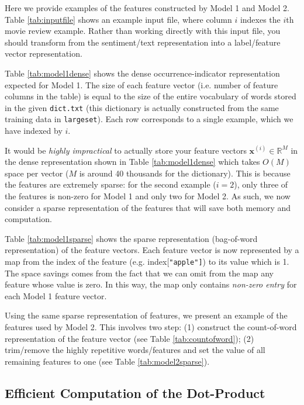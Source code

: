 \documentclass[11pt]{exam}
\numberwithin{equation}{section} %
\numberwithin{figure}{section} %
\numberwithin{table}{section} %
\newcommand{\Rb}{\mathbb{R}}
\newcommand{\xv}{\mathbf{x}}
\begin{document}
Here we provide examples of the features constructed by Model 1 and Model 2. Table \ref{tab:inputfile} shows an example input file, where column $i$  indexes the $i$th movie review example. Rather than working directly with this input file, you should transform from the sentiment/text representation into a label/feature vector representation.

Table \ref{tab:model1dense} shows the dense occurrence-indicator representation expected for Model 1. The size of each feature vector (i.e. number of feature columns in the table) is equal to the size of the entire vocabulary of words stored in the given \lstinline{dict.txt} (this dictionary is actually constructed from the same training data in \lstinline{largeset}). Each row corresponds to a single example, which we have indexed by $i$.

It would be \emph{highly impractical} to actually store your feature vectors $\xv^{(i)} \in \Rb^M$ in the dense representation shown in Table \ref{tab:model1dense} which takes $O(M)$ space per vector ($M$ is around 40 thousands for the dictionary). This is because the features are extremely sparse: for the second example ($i=2$), only three of the features is non-zero for Model 1 and only two for Model 2. As such, we now consider a sparse representation of the features that will save both memory and computation.

Table \ref{tab:model1sparse} shows the sparse representation (bag-of-word representation) of the feature vectors. Each feature vector is now represented by a map from the index of the feature (e.g. {index[\tt "apple"]}) to its value which is 1. The space savings comes from the fact that we can omit from the map any feature whose value is zero. In this way, the map only contains \emph{non-zero entry} for each Model 1 feature vector.

Using the same sparse representation of features, we present an example of the features used by Model 2. This involves two step: (1) construct the count-of-word representation of the feature vector (see Table \ref{tab:countofword}); (2) trim/remove the highly repetitive words/features  and set the value of all remaining features to one (see Table \ref{tab:model2sparse}).




\subsection{Efficient Computation of the Dot-Product} \label{efficientdp}
\end{document}

